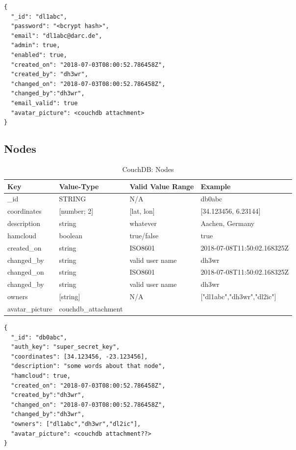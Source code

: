 \begin{lstlisting}
{
  "_id": "dl1abc",
  "password": "<bcrypt hash>",
  "email": "dl1abc@darc.de",
  "admin": true,
  "enabled": true,
  "created_on": "2018-07-03T08:00:52.786458Z",
  "created_by": "dh3wr",
  "changed_on": "2018-07-03T08:00:52.786458Z",
  "changed_by":"dh3wr",
  "email_valid": true
  "avatar_picture": <couchdb attachment>
}
\end{lstlisting}


\subsection{Nodes}
\begin{table}[h]
 \caption{CouchDB: Nodes}
 \begin{tabular}{|l|l|l|l|} \hline
  Key & Value-Type & Valid Value Range & Example \\
  \hline
  \_id & STRING & N/A & db0abc \\
  coordinates & [number; 2]  & [lat, lon] & [34.123456, 6.23144] \\
  description & string & whatever & Aachen, Germany\\
  hamcloud & boolean & true/false & true \\
  created\_on & string & ISO8601 & 2018-07-08T11:50:02.168325Z \\
  changed\_by & string & valid user name & dh3wr \\
  changed\_on & string & ISO8601 & 2018-07-08T11:50:02.168325Z \\
  changed\_by & string & valid user name & dh3wr \\
  owners & [string] & N/A & ["dl1abc","dh3wr","dl2ic"] \\
  avatar\_picture & couchdb\_attachment & & \\ \hline
  \end{tabular}
  \label{tab:couchdb:nodes}
\end{table}

\begin{lstlisting}
{
  "_id": "db0abc",
  "auth_key": "super_secret_key",
  "coordinates": [34.123456, -23.123456],
  "description": "some words about that node",
  "hamcloud": true,
  "created_on": "2018-07-03T08:00:52.786458Z",
  "created_by":"dh3wr",
  "changed_on": "2018-07-03T08:00:52.786458Z",
  "changed_by":"dh3wr",
  "owners": ["dl1abc","dh3wr","dl2ic"],
  "avatar_picture": <couchdb attachment??>
}
\end{lstlisting}

